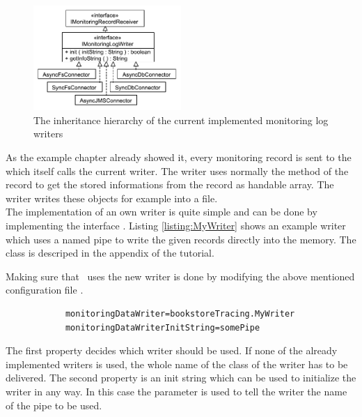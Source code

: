		\begin{figure}[H]
			\begin{centering}
				\includegraphics[width=0.5\textwidth]{images/kieker_writerimpls}
				\caption{The inheritance hierarchy of the current implemented monitoring log writers}
				\label{figure:monitoringLogWritersHierarchy}
			\end{centering}
		\end{figure}


		\noindent As the example chapter already showed it, every monitoring record is sent to the  which itself calls the current writer. The writer uses normally the  method of the record to get the stored informations from the record as handable array. The writer writes these objects for example into a file.\\
		The implementation of an own writer is quite simple and can be done by implementing the interface . Listing \ref{listing:MyWriter} shows an example writer which uses a named pipe to write the given records directly into the memory. The class  is descriped in the appendix of the tutorial. 

		\setJavaCodeListing
		

		\noindent Making sure that \Kieker\  uses the new writer is done by modifying the above mentioned configuration file \dir{\monitoringPropertiesFile}.

		\setBashListing       
		\begin{lstlisting}
			monitoringDataWriter=bookstoreTracing.MyWriter
			monitoringDataWriterInitString=somePipe
		\end{lstlisting}

		\noindent The first property decides which writer should be used. If none of the already implemented writers is used, the whole name of the class of the writer has to be delivered. The second property is an init string which can be used to initialize the writer in any way. In this case the parameter is used to tell the writer the name of the pipe to be used.\\
